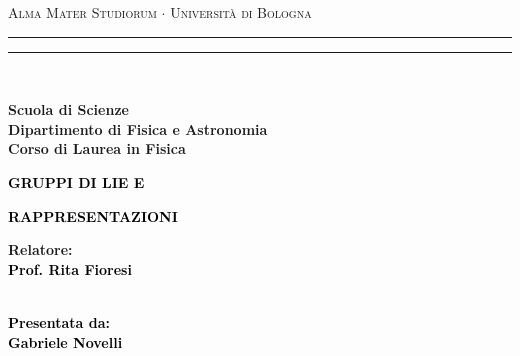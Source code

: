 \documentclass[12pt,a4paper]{report}
\theoremstyle{definition}
\theoremstyle{Theorem}
\theoremstyle{definition}
\theoremstyle{definition}
\theoremstyle{definition}
\begin{document}
	\begin{frontespizio}
			\begin{titlepage}
			\begin{center}
				{{\Large{\textsc{Alma Mater Studiorum $\cdot$ Universit\`a di Bologna}}}} 
				\rule[0.1cm]{15.8cm}{0.1mm}
				\rule[0.5cm]{15.8cm}{0.6mm}
				\\\vspace{3mm}
				
				{\small{\bf Scuola di Scienze \\ 
						Dipartimento di Fisica e Astronomia\\
						Corso di Laurea in Fisica}}
				
			\end{center}
			
			\vspace{23mm}
			
			\begin{center}\textcolor{black}{
					{\LARGE{\bf GRUPPI DI LIE E }}
			}\end{center}
		\begin{center}\textcolor{black}{
				{\LARGE{\bf RAPPRESENTAZIONI}}\\
		}\end{center}
			
			\vspace{50mm} \par \noindent
			
			\begin{minipage}[t]{0.47\textwidth}
				{\large{\bf Relatore: \vspace{2mm}\\\textcolor{black}{
							Prof. Rita Fioresi}\\\\
					}}
			\end{minipage}
			\hfill
			\begin{minipage}[t]{0.47\textwidth}\raggedleft \textcolor{black}{
					{\large{\bf Presentata da:
							\vspace{2mm}\\
							Gabriele Novelli}}}
			\end{minipage}
			

\end{titlepage}
\end{frontespizio}
\end{document}
